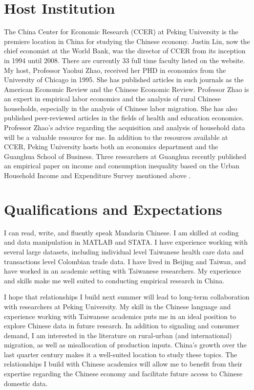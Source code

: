 \documentclass[a4paper,10pt]{article}
\begin{document}
\section{Host Institution}
The China Center for Economic Research (CCER) at Peking University is the premiere location in China for studying the Chinese economy.  Justin Lin, now the chief economist at the World Bank, was the director of CCER from its inception in 1994 until 2008.  There are currently 33 full time faculty listed on the website.  My host, Professor Yaohui Zhao, received her PHD in economics from the University of Chicago in 1995. She has published articles in such journals as the American Economic Review and the Chinese Economic Review.  Professor Zhao is an expert in empirical labor economics and the analysis of rural Chinese households, especially in the analysis of Chinese labor migration.  She has also published peer-reviewed articles in the fields of health and education economics. Professor Zhao's advice regarding the acquisition and analysis of household data will be a valuable resource for me.  In addition to the resources available at CCER, Peking University hosts both an economics department and the Guanghua School of Business.  Three researchers at Guanghua recently published an empirical paper on income and consumption inequality based on the Urban Household Income and Expenditure Survey mentioned above \citep{Caietal2010}.  

\section{Qualifications and Expectations}
I can read, write, and fluently speak Mandarin Chinese.  I am skilled at coding and data manipulation in MATLAB and STATA.  I have experience working with several large datasets, including individual level Taiwanese health care data and transactions level Colombian trade data.  I have lived in Beijing and Taiwan, and have worked in an academic setting with Taiwanese researchers.  My experience and skills make me well suited to conducting empirical research in China.  

I hope that relationships I build next summer will lead to long-term collaboration with researchers at Peking University.  My skill in the Chinese language and experience working with Taiwanese academics puts me in an ideal position to explore Chinese data in future research.  In addition to signaling and consumer demand, I am interested in the literature on rural-urban (and international) migration, as well as misallocation of production inputs.  China's growth over the last quarter century makes it a well-suited location to study these topics. The relationships I build with Chinese academics will allow me to benefit from their expertise regarding the Chinese economy and facilitate future access to Chinese domestic data. 
\end{document}
